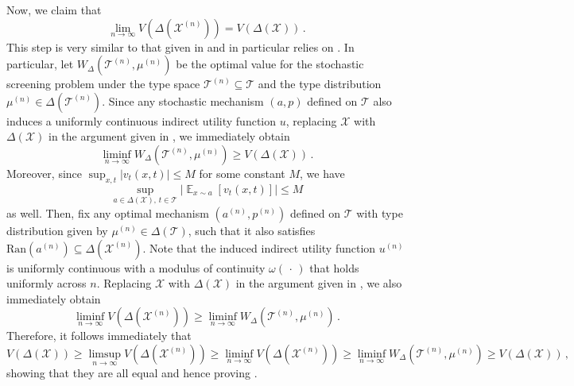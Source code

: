 \documentclass[12pt,letterpaper]{article}
\newenvironment{original}{\color{black}\noindent}{}
\theoremstyle{plain}
\theoremstyle{definition}
\theoremstyle{remark}
\DeclareMathOperator{\E}{\mathds{E}}
\renewcommand{\1}{\mathds{1}}
\newcommand{\X}{\mathcal{X}}
\theoremstyle{definition}
\begin{document}
\begin{original}
Now, we claim that
\[\lim_{n \rightarrow \infty} V(\Delta(\X^{(n)})) = V(\Delta(\X))\,.\]
This step is very similar to that given in  and in particular relies on . In particular, let $W_{\Delta}(\mathcal{T}^{(n)}, \mu^{(n)})$ be the optimal value for the stochastic screening problem under the type space $\mathcal{T}^{(n)} \subseteq \mathcal{T}$ and the type distribution $\mu^{(n)} \in \Delta(\mathcal{T}^{(n)})$. Since any stochastic mechanism $(a, p)$ defined on $\mathcal{T}$ also induces a uniformly continuous indirect utility function $u$, replacing $\X$ with $\Delta(\X)$ in the argument given in , we immediately obtain
\[\liminf_{n\rightarrow\infty} W_\Delta(\mathcal{T}^{(n)}, \mu^{(n)}) \geq  V(\Delta(\X)) \,.\]
Moreover, since $\sup_{x, t}|v_t(x, t)| \leq M$ for some constant $M$, we have
\[\sup_{a \in \Delta(\X),\, t \in \mathcal{T}} \big|\E_{x \sim a}[v_t(x, t)]\big| \leq M \]
as well. Then, fix any optimal mechanism $(a^{(n)}, p^{(n)})$ defined on $\mathcal{T}$ with type distribution given by $\mu^{(n)} \in \Delta(\mathcal{T})$, such that it also satisfies $\text{Ran}(a^{(n)}) \subseteq \Delta(\X^{(n)})$. Note that the induced indirect utility function $u^{(n)}$ is uniformly continuous with a modulus of continuity $\omega(\,\cdot\,)$ that holds uniformly across $n$. Replacing $\X$ with $\Delta(\X)$ in the argument given in , we also immediately obtain
\[\liminf_{n \rightarrow \infty} V(\Delta(\X^{(n)})) \geq \liminf_{n\rightarrow\infty} W_\Delta(\mathcal{T}^{(n)}, \mu^{(n)})\,.\]
Therefore, it follows immediately that
\[V(\Delta(\X)) \geq \limsup_{n \rightarrow \infty} V(\Delta(\X^{(n)})) \geq \liminf_{n \rightarrow \infty} V(\Delta(\X^{(n)})) \geq \liminf_{n\rightarrow\infty} W_\Delta(\mathcal{T}^{(n)}, \mu^{(n)}) \geq  V(\Delta(\X)) \,,\]
showing that they are all equal and hence proving .
\end{original}
\end{document}
